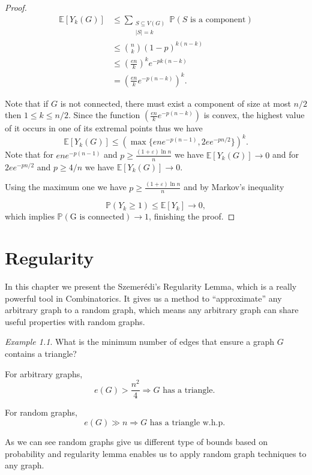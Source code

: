 \documentclass[12pt,twoside,a4paper,bibliography=totocnumbered]{book}
\numberwithin{equation}{section}
\let\log=\ln
\theoremstyle{remark}
\newtheorem{example}	[theorem] {Example}
\begin{document}
\begin{proof}
\begin{align*}
\mathbb{E}[Y_k (G)]  & \leq \sum_{\substack{S\subseteq V(G) \\ |S| = k}} \mathbb{P}(S\text{ is a component})\\
&\leq \binom{n}{k}(1-p)^{k(n-k)}\\
&\leq \left( \frac{en}{k} \right) ^k e^{-pk(n-k)}\\
& = \left( \frac{en}{k} e^{-p(n-k)} \right)^k.
\end{align*}

Note that if $G$ is not connected, there must exist a component of size at most $ n/2$ then $1 \leq k \leq n/2$. Since the function $\left( \frac{en}{k} e^{-p(n-k)} \right)$ is convex, the highest value of it occurs in one of its extremal points thus we have
$$\mathbb{E}[Y_k (G)] \leq (\max\{ene^{-p(n-1)}, 2ee^{-pn/2}\})^k .$$
Note that for $ene^{-p(n-1)}$ and $p \geq \frac{(1 + \varepsilon) \log n}{n}$ we have $\mathbb{E}[Y_k (G)] \rightarrow 0$ and for $2ee^{-pn/2}$ and $p \geq 4/n$ we have $\mathbb{E}[Y_k (G)] \rightarrow 0$.

Using the maximum one we have $p \geq \frac{(1 + \varepsilon) \log n}{n}$  and by Markov's inequality

 $$\mathbb{P}(Y_k \geq 1) \leq \mathbb{E}[Y_k] \rightarrow 0,$$
 which implies $\mathbb{P}(\text{G is connected}) \rightarrow 1$, finishing the proof.

\end{proof}
\chapter{Regularity}
In this chapter we present the Szemerédi's Regularity Lemma, which is a really powerful tool in Combinatorics. It gives us a method to ``approximate'' any arbitrary graph to a random graph, which means any arbitrary graph can share useful properties with random graphs.

\begin{example}
What is the minimum number of edges that ensure a graph $G$ contains a triangle?

For arbitrary graphs,
$$ e(G) > \frac{n^2}{4} \Rightarrow G \text{ has a triangle. }$$

For random graphs,
$$ e(G) \gg n \Rightarrow G\text{ has a triangle w.h.p. } $$

As we can see random graphs give us different type of bounds based on probability and regularity lemma enables us to apply random graph techniques to any graph.

\end{example}
\end{document}
